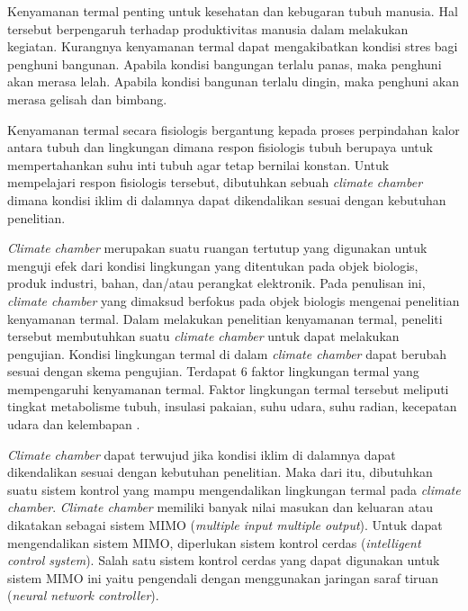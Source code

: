 Kenyamanan termal penting untuk kesehatan dan kebugaran tubuh manusia. Hal tersebut berpengaruh terhadap produktivitas manusia dalam melakukan kegiatan. Kurangnya kenyamanan termal dapat mengakibatkan kondisi stres bagi penghuni bangunan. Apabila kondisi bangungan terlalu panas, maka penghuni akan merasa lelah. Apabila kondisi bangunan terlalu dingin, maka penghuni akan merasa gelisah dan bimbang.

Kenyamanan termal secara fisiologis bergantung kepada proses perpindahan kalor antara tubuh dan lingkungan dimana respon fisiologis tubuh berupaya untuk mempertahankan suhu inti tubuh agar tetap bernilai konstan. Untuk mempelajari respon fisiologis tersebut, dibutuhkan sebuah \textit{climate chamber} dimana kondisi iklim di dalamnya dapat dikendalikan sesuai dengan kebutuhan penelitian.

\textit{Climate chamber} merupakan suatu ruangan tertutup yang digunakan untuk menguji efek dari kondisi lingkungan yang ditentukan pada objek biologis, produk industri, bahan, dan/atau perangkat elektronik. Pada penulisan ini, \textit{climate chamber} yang dimaksud berfokus pada objek biologis mengenai penelitian kenyamanan termal. Dalam melakukan penelitian kenyamanan termal, peneliti tersebut membutuhkan suatu \textit{climate chamber} untuk dapat melakukan pengujian. Kondisi lingkungan termal di dalam \textit{climate chamber} dapat berubah sesuai dengan skema pengujian. Terdapat 6 faktor lingkungan termal yang mempengaruhi kenyamanan termal. Faktor lingkungan termal tersebut meliputi tingkat metabolisme tubuh, insulasi pakaian, suhu udara, suhu radian, kecepatan udara dan kelembapan \cite{ASHRAE55}.

\textit{Climate chamber} dapat terwujud jika kondisi iklim di dalamnya dapat dikendalikan sesuai dengan kebutuhan penelitian. Maka dari itu, dibutuhkan suatu sistem kontrol yang mampu mengendalikan lingkungan termal pada \textit{climate chamber}. \textit{Climate chamber} memiliki banyak nilai masukan dan keluaran atau dikatakan sebagai sistem MIMO (\textit{multiple input multiple output}). Untuk dapat mengendalikan sistem MIMO, diperlukan sistem kontrol cerdas (\textit{intelligent control system}). Salah satu sistem kontrol cerdas yang dapat digunakan untuk sistem MIMO ini yaitu pengendali dengan menggunakan jaringan saraf tiruan (\textit{neural network controller}).

